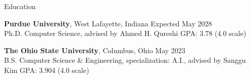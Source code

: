 \documentclass[10pt]{resume}
\begin{document}

\begin{rSection}{Education}

  {\bf Purdue University}, West Lafayette, Indiana \hfill Expected May 2028 \\
  Ph.D. Computer Science, advised by Ahmed H. Qureshi \hfill GPA: 3.78 (4.0 scale)

  {\bf The Ohio State University}, Columbus, Ohio \hfill May 2023 \\
  B.S. Computer Science \& Engineering, specialization: A.I., advised by Sanggu Kim \hfill GPA: 3.904 (4.0 scale)

\end{rSection}

\end{document}
